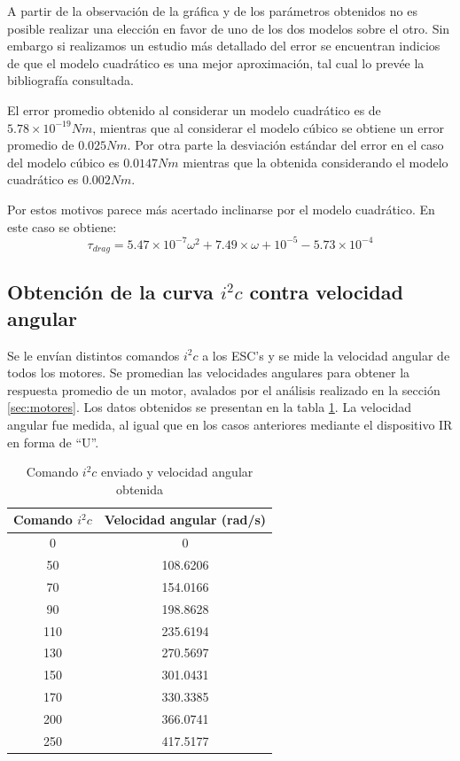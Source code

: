 \documentclass[spanish,12pt,a4paper,titlepage]{report}
\begin{document}
A partir de la observación de la gráfica y de los parámetros obtenidos no es posible realizar una elección en favor de uno de los dos modelos sobre el otro. Sin embargo si realizamos un estudio más detallado del error se encuentran indicios de que el modelo cuadrático es una mejor aproximación, tal cual lo prevée la bibliografía consultada. 

El error promedio obtenido al considerar un modelo cuadrático es de $5.78 \times 10^{-19} Nm$, mientras que al considerar el modelo cúbico se obtiene un error promedio de $0.025Nm$. Por otra parte la desviación estándar del error en el caso del modelo cúbico es $0.0147Nm$ mientras que la obtenida considerando el modelo cuadrático es $0.002Nm$.

Por estos motivos parece más acertado inclinarse por el modelo cuadrático. En este caso se obtiene:
\begin{equation}
\tau_{drag}=5.47 \times 10^{-7}\omega ^2+7.49 \times \omega + 10^{-5}-5.73 \times 10^{-4}
\end{equation} 


\subsection{Obtención de la curva $i^2c$ contra velocidad angular}

Se le envían distintos comandos $i^2c$ a los ESC's y se mide la velocidad angular de todos los motores. Se promedian las velocidades angulares para obtener la respuesta promedio de un motor, avalados por el análisis realizado en la sección \ref{sec:motores}. Los datos obtenidos se presentan en la tabla \ref{tab:iw}. La velocidad angular fue medida, al igual que en los casos anteriores mediante el dispositivo IR en forma de ``U''.

\begin{table}[H]
\centering
\begin{tabular}{|c|c|} 
	\hline
	\cellcolor[gray]{0.8} \textbf{Comando $i^2c$} & 
	\cellcolor[gray]{0.8} \textbf{Velocidad angular (rad/s)} \\ \hline \hline
	  0 &        0 \\ \hline 
	 50 & 108.6206 \\ \hline
	 70 & 154.0166 \\ \hline
	 90 & 198.8628 \\ \hline
	110 & 235.6194 \\ \hline
	130 & 270.5697 \\ \hline
	150 & 301.0431 \\ \hline
	170 & 330.3385 \\ \hline
	200 & 366.0741 \\ \hline
	250 & 417.5177 \\ \hline
\end{tabular}
\caption{Comando $i^2c$ enviado y velocidad angular obtenida}
\label{tab:iw}
\end{table}
\end{document}
